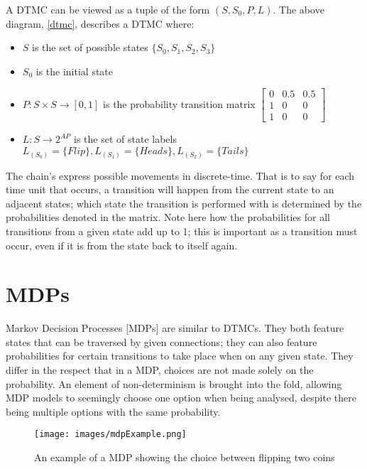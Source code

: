 \documentclass{l4proj}
\begin{document}
A DTMC can be viewed as a tuple of the form $(S, S{_0}, P, L)$. The above diagram, \ref{dtmc}, describes a DTMC where:
\begin{itemize}
\item{$S$ is the set of possible states $\lbrace S_0, S_1, S_2, S_3 \rbrace $}
\item{$S{_0}$ is the initial state}
\item{$P : S \times S \rightarrow [0,1]$ is the probability transition matrix $\begin{bmatrix}
0 & 0.5 & 0.5\\ 
1 & 0 & 0\\ 
1 & 0 & 0
\end{bmatrix}$}
\item{$L : S \rightarrow 2^{AP}$ is the set of state labels $L_{(S_0)}=\lbrace Flip \rbrace , L_{(S_1)}=\lbrace Heads \rbrace , L_{(S_2)}=\lbrace Tails \rbrace$}
\end{itemize}

The chain's express possible movements in discrete-time. That is to say for each time unit that occurs, a transition will happen from the current state to an adjacent states; which state the transition is performed with is determined by the probabilities denoted in the matrix. Note here how the probabilities for all transitions from a given state add up to 1; this is important as a transition must occur, even if it is from the state back to itself again. 


\section{MDPs}


Markov Decision Processes [MDPs] are similar to DTMCs. They both feature states that can be traversed by given connections; they can also feature probabilities for certain transitions to take place when on any given state. They differ in the respect that in a MDP, choices are not made solely on the probability. An element of non-determinism is brought into the fold, allowing MDP models to seemingly choose one option when being analysed, despite there being multiple options with the same probability. 

\begin{figure}[ht!]
\centering
\texttt{[image: images/mdpExample.png]}
\caption{An example of a MDP showing the choice between flipping two coins}
\label{mdp}
\end{figure}
\end{document}
